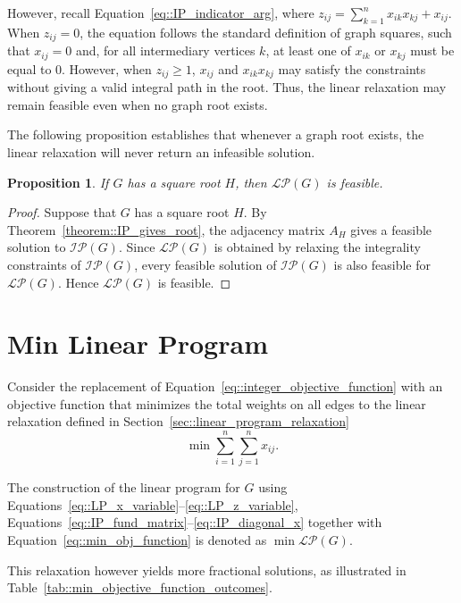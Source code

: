 \documentclass[11pt]{report}
\newtheorem{proposition}{Proposition}
\begin{document}
However, recall Equation~\eqref{eq::IP_indicator_arg}, where $\displaystyle z_{ij} = \sum_{k = 1}^{n} x_{ik}x_{kj} + x_{ij}$. When $z_{ij} = 0$, the equation follows the standard definition of graph squares, such that $x_{ij} = 0$ and, for all intermediary vertices $k$, at least one of $x_{ik}$ or $x_{kj}$ must be equal to $0$. However, when $z_{ij} \geq 1$, $x_{ij}$ and $x_{ik}x_{kj}$ may satisfy the constraints without giving a valid integral path in the root. Thus, the linear relaxation may remain feasible even when no graph root exists.

The following proposition establishes that whenever a graph root exists, the linear relaxation will never return an infeasible solution. 

\begin{proposition} \label{prop::linear_relaxation_feasibility}
  If $G$ has a square root $H$, then $\mathcal{LP}(G)$ is feasible. 
\end{proposition}

\begin{proof}
  Suppose that $G$ has a square root $H$. By Theorem~\ref{theorem::IP_gives_root}, the adjacency matrix $A_H$ gives a feasible solution to $\mathcal{IP}(G)$. Since $\mathcal{LP}(G)$ is obtained by relaxing the integrality constraints of $\mathcal{IP}(G)$, every feasible solution of $\mathcal{IP}(G)$ is also feasible for $\mathcal{LP}(G)$. Hence $\mathcal{LP}(G)$ is feasible.
\end{proof}

\section{Min Linear Program} \label{sec::min_linear_program}

Consider the replacement of Equation~\ref{eq::integer_objective_function} with an objective function that minimizes the total weights on all edges to the linear relaxation defined in Section~\ref{sec::linear_program_relaxation} 
\begin{equation} \label{eq::min_obj_function}
  \min \sum_{i=1}^{n} \sum_{j=1}^{n} x_{ij}.
\end{equation}

The construction of the linear program for $G$ using Equations~\eqref{eq::LP_x_variable}--\eqref{eq::LP_z_variable}, Equations~\eqref{eq::IP_fund_matrix}--\eqref{eq::IP_diagonal_x} together with Equation~\eqref{eq::min_obj_function} is denoted as $\min \mathcal{LP}(G)$. 

This relaxation however yields more fractional solutions, as illustrated in Table~\ref{tab::min_objective_function_outcomes}.  
\end{document}
